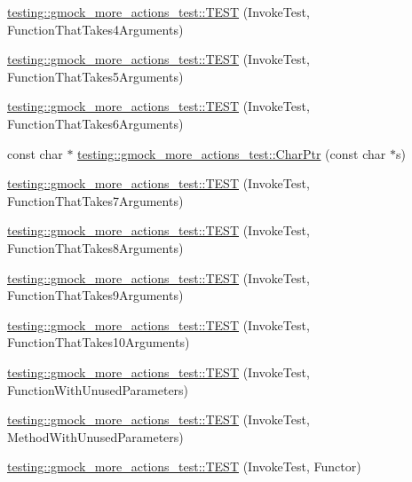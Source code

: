 \begin{DoxyCompactItemize}
\item 
\hyperlink{namespacetesting_1_1gmock__more__actions__test_a17f41c1f7f180371d4d240089cdff0dd}{testing\+::gmock\+\_\+more\+\_\+actions\+\_\+test\+::\+T\+E\+ST} (Invoke\+Test, Function\+That\+Takes4\+Arguments)
\item 
\hyperlink{namespacetesting_1_1gmock__more__actions__test_a3b6b1b682295a1d04d57374445359e94}{testing\+::gmock\+\_\+more\+\_\+actions\+\_\+test\+::\+T\+E\+ST} (Invoke\+Test, Function\+That\+Takes5\+Arguments)
\item 
\hyperlink{namespacetesting_1_1gmock__more__actions__test_a9a6c89b83ba253838d05d7ee5da7d954}{testing\+::gmock\+\_\+more\+\_\+actions\+\_\+test\+::\+T\+E\+ST} (Invoke\+Test, Function\+That\+Takes6\+Arguments)
\item 
const char $\ast$ \hyperlink{namespacetesting_1_1gmock__more__actions__test_aa19ac39aaa785adeb8d7837d58b824f3}{testing\+::gmock\+\_\+more\+\_\+actions\+\_\+test\+::\+Char\+Ptr} (const char $\ast$s)
\item 
\hyperlink{namespacetesting_1_1gmock__more__actions__test_af4756ff87444dc6deb438a350ab5527f}{testing\+::gmock\+\_\+more\+\_\+actions\+\_\+test\+::\+T\+E\+ST} (Invoke\+Test, Function\+That\+Takes7\+Arguments)
\item 
\hyperlink{namespacetesting_1_1gmock__more__actions__test_a48d99224a323afa3c9772a868dd60214}{testing\+::gmock\+\_\+more\+\_\+actions\+\_\+test\+::\+T\+E\+ST} (Invoke\+Test, Function\+That\+Takes8\+Arguments)
\item 
\hyperlink{namespacetesting_1_1gmock__more__actions__test_a65d674aacb46d8bf79dbdfe0d49df442}{testing\+::gmock\+\_\+more\+\_\+actions\+\_\+test\+::\+T\+E\+ST} (Invoke\+Test, Function\+That\+Takes9\+Arguments)
\item 
\hyperlink{namespacetesting_1_1gmock__more__actions__test_a8939ea1ccb0d8787c926c92441b27f6c}{testing\+::gmock\+\_\+more\+\_\+actions\+\_\+test\+::\+T\+E\+ST} (Invoke\+Test, Function\+That\+Takes10\+Arguments)
\item 
\hyperlink{namespacetesting_1_1gmock__more__actions__test_a0dd6901e637db57c56f1cf8052b6e1bf}{testing\+::gmock\+\_\+more\+\_\+actions\+\_\+test\+::\+T\+E\+ST} (Invoke\+Test, Function\+With\+Unused\+Parameters)
\item 
\hyperlink{namespacetesting_1_1gmock__more__actions__test_a4f48af38351403b569fc6dfae7787ed2}{testing\+::gmock\+\_\+more\+\_\+actions\+\_\+test\+::\+T\+E\+ST} (Invoke\+Test, Method\+With\+Unused\+Parameters)
\item 
\hyperlink{namespacetesting_1_1gmock__more__actions__test_ac56a4cb164b338d3f388ed3f4306a5a5}{testing\+::gmock\+\_\+more\+\_\+actions\+\_\+test\+::\+T\+E\+ST} (Invoke\+Test, Functor)

\end{DoxyCompactItemize}
